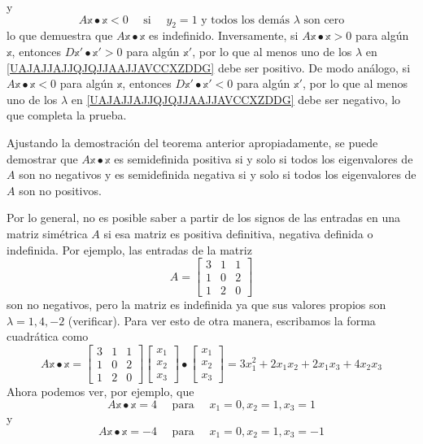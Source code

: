 \begin{theorem}
\begin{enumerate}[label=\roman*)]
        y
        $$A\mathbb{x} \bullet \mathbb{x} < 0 \quad \text{ si } \quad y_2 = 1 \text{ y todos los demás } \lambda \text{ son cero}$$
        lo que demuestra que $A\mathbb{x} \bullet \mathbb{x}$ es indefinido. Inversamente, si $A\mathbb{x} \bullet \mathbb{x} > 0$ para algún $\mathbb{x}$, entonces $D\mathbb{x}' \bullet \mathbb{x}' > 0$ para algún $\mathbb{x}'$, por lo que al menos uno de los $\lambda$ en \eqref{UAJAJJAJJQJQJJAAJJAVCCXZDDG} debe ser positivo. De modo análogo, si $A\mathbb{x} \bullet \mathbb{x} < 0$ para algún $\mathbb{x}$, entonces $D\mathbb{x}' \bullet \mathbb{x}' < 0$ para algún $\mathbb{x}'$, por lo que al menos uno de los $\lambda$ en \eqref{UAJAJJAJJQJQJJAAJJAVCCXZDDG} debe ser negativo, lo que completa la prueba.
    \end{enumerate}
\end{theorem}

Ajustando la demostración del teorema anterior apropiadamente, se puede demostrar que $A\mathbb{x} \bullet \mathbb{x}$ es semidefinida positiva si y solo si todos los eigenvalores de $A$ son no negativos y es semidefinida negativa si y solo si todos los eigenvalores de $A$ son no positivos.

\begin{example}
    Por lo general, no es posible saber a partir de los signos de las entradas en una matriz simétrica $A$ si esa matriz es positiva definitiva, negativa definida o indefinida. Por ejemplo, las entradas de la matriz
    $$A = \begin{bmatrix}
        3 & 1 & 1 \\
        1 & 0 & 2 \\
        1 & 2 & 0
    \end{bmatrix}$$
    son no negativos, pero la matriz es indefinida ya que sus valores propios son $\lambda = 1, 4, -2$ (verificar). Para ver esto de otra manera, escribamos la forma cuadrática como
    $$A\mathbb{x} \bullet \mathbb{x} = \begin{bmatrix}
        3 & 1 & 1 \\
        1 & 0 & 2 \\
        1 & 2 & 0
    \end{bmatrix} \begin{bmatrix}
        x_1 \\
        x_2 \\
        x_3
    \end{bmatrix} \bullet \begin{bmatrix}
        x_1 \\
        x_2 \\
        x_3
    \end{bmatrix} = 3x_1^2 + 2x_1x_2 + 2x_1x_3 + 4x_2x_3$$
    Ahora podemos ver, por ejemplo, que
    $$A\mathbb{x} \bullet \mathbb{x} = 4 \quad \text{ para } \quad x_1 = 0, x_2 = 1, x_3 = 1$$
    y
    $$A\mathbb{x} \bullet \mathbb{x} = -4 \quad \text{ para } \quad x_1 = 0, x_2 = 1, x_3 = -1$$
\end{example}

